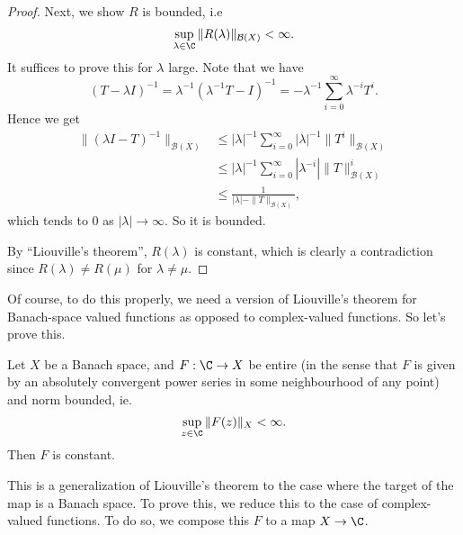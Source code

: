 \documentclass[a4paper]{article}
\begin{document}
\begin{proof}
  Next, we show $R$ is bounded, i.e
  \[
    \sup_{\lambda \in \C} \|R (\lambda)\|_{\mathcal{B}(X)} < \infty.
  \]
  It suffices to prove this for $\lambda$ large. Note that we have
  \[
    (T - \lambda I)^{-1} = \lambda^{-1}(\lambda^{-1} T - I)^{-1} = -\lambda^{-1} \sum_{i = 0}^\infty \lambda^{-i} T^i.
  \]
  Hence we get
  \begin{align*}
    \|(\lambda I - T)^{-1}\|_{\mathcal{B}(X)} &\leq |\lambda|^{-1}\sum_{i = 0}^\infty |\lambda|^{-1} \|T^i\|_{\mathcal{B}(X)}\\
    &\leq |\lambda|^{-1} \sum_{i = 0}^\infty |\lambda^{-i}| \|T\|^i_{\mathcal{B}(X)}\\
    &\leq \frac{1}{|\lambda| - \|T\|_{\mathcal{B}(X)}},
  \end{align*}
  which tends to $0$ as $|\lambda| \to \infty$. So it is bounded.

  By ``Liouville's theorem'', $R(\lambda)$ is constant, which is clearly a contradiction since $R(\lambda) \not= R(\mu)$ for $\lambda \not= \mu$.
\end{proof}
Of course, to do this properly, we need a version of Liouville's theorem for Banach-space valued functions as opposed to complex-valued functions. So let's prove this.

\begin{prop}
  Let $X$ be a Banach space, and $F: \C \to X$ be entire (in the sense that $F$ is given by an absolutely convergent power series in some neighbourhood of any point) and norm bounded, ie.
  \[
    \sup_{z \in \C} \|F(z)\|_X < \infty.
  \]
  Then $F$ is constant.
\end{prop}
This is a generalization of Liouville's theorem to the case where the target of the map is a Banach space. To prove this, we reduce this to the case of complex-valued functions. To do so, we compose this $F$ to a map $X \to \C$.
\end{document}

